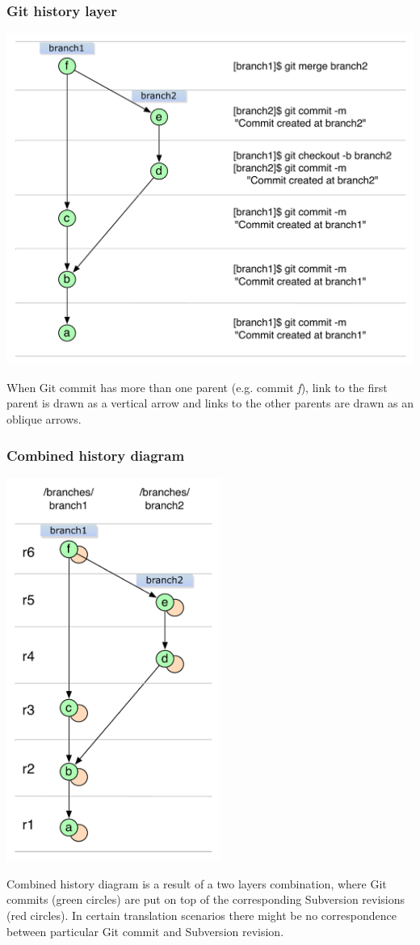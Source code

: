 \subsubsection{Git history layer}
\begin{center}
\includegraphics[width=\textwidth]{img/legend/git_layer.pdf}%
\label{git_layer}%
\end{center}
When Git commit has more than one parent (e.g. commit \emph{f}), link to the first parent is drawn as a vertical arrow and links to the other 
parents are drawn as an oblique arrows.
\subsubsection{Combined history diagram}
\begin{center}
\includegraphics[width=7.0cm]{img/legend/generalized_history.pdf}%
\label{both_layers}%
\end{center}

Combined history diagram is a result of a two layers combination, where Git commits (green circles) are put on top of the corresponding Subversion revisions (red circles). 
In certain translation scenarios there might be no correspondence between particular Git commit and Subversion revision.